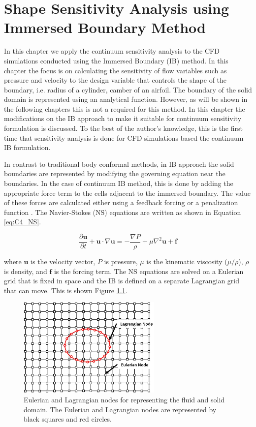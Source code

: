 \chapter{Shape Sensitivity Analysis using Immersed Boundary Method}
In this chapter we apply the continuum sensitivity analysis to the CFD simulations conducted using the Immersed Boundary (IB) method. In this chapter the focus is on calculating the sensitivity of flow variables such as pressure and velocity to the design variable that controls the shape of the boundary, i.e. radius of a cylinder, camber of an airfoil. The boundary of the solid domain is represented using an analytical function. However, as will be shown in the following chapters this is not a required for this method. In this chapter the modifications on the IB approach to make it suitable for continuum sensitivity formulation is discussed. To the best of the author's knowledge, this is the first time that sensitivity analysis is done for CFD simulations based the continuum IB formulation.

In contrast to traditional body conformal methods, in IB approach the solid boundaries are represented by modifying the governing equation near the boundaries. In the case of continuum IB method, this is done by adding the appropriate force term to the cells adjacent to the immersed boundary. The value of these forces are calculated either using a feedback forcing \cite{goldstein1993modeling} or a penalization function \cite{arquis1984conditions}. The Navier-Stokes (NS) equations are written as shown in Equation \eqref{eq:C4_NS}.

\begin{equation}\label{eq:C4_NS}
	\frac{\partial \mathbf{u}}{\partial t} + \mathbf{u} \cdot \nabla \mathbf{u} = 
	-\frac{\nabla P}{\rho} + \mu \nabla^2 \mathbf{u} + \mathbf{f}
\end{equation}

where $\mathbf{u}$ is the velocity vector, $P$ is pressure, $\mu$ is the kinematic viscosity ($\mu / \rho$), $\rho$ is density, and $\mathbf{f}$ is the forcing term. The NS equations are solved on a Eulerian grid that is fixed in space and the IB is defined on a separate Lagrangian grid that can move. This is shown Figure \ref{fig:C4_lagrangianAndEulerianDomain}.

\begin{figure}[H]
	\centering
	\includegraphics[width=7.00cm]{Chapter_4/figure/lagrangian_and_eulerian_nodes.jpg}
	\caption{Eulerian and Lagrangian nodes for representing the fluid and solid domain. The Eulerian and Lagrangian nodes are represented by black squares and red circles.}
	\label{fig:C4_lagrangianAndEulerianDomain}
\end{figure}

